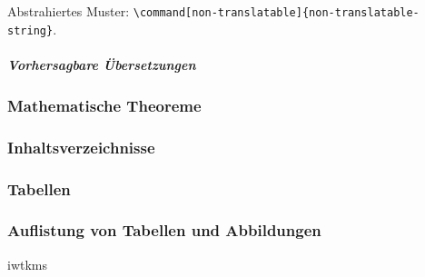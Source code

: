Abstrahiertes Muster: \verb|\command[non-translatable]{non-translatable-string}|.

\subparagraph{Vorhersagbare Übersetzungen} %


\subsubsection{Mathematische Theoreme}

\newpage



\newpage

\subsubsection{Inhaltsverzeichnisse}



\newpage

\subsubsection{Tabellen}

\newpage

\subsubsection{Auflistung von Tabellen und Abbildungen}
iwtkms
\newpage